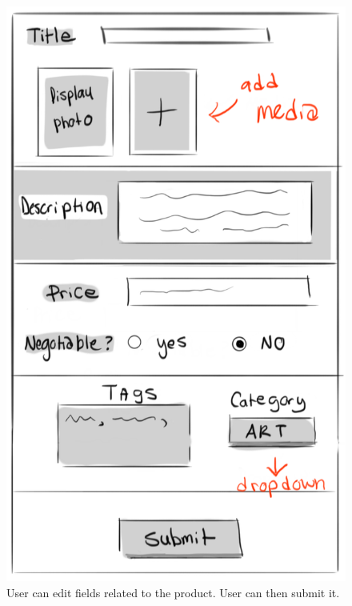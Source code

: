 \documentclass[]{article}
\begin{document}
\begin{enumerate}
			\begin{figure}
			  \includegraphics[width=\linewidth]{./pictures/create_page.png}
			  \caption{User can edit fields related to the product. User can then submit it.}
			  \label{fig:seller4}
			\end{figure}
			

\end{enumerate}
\end{document}
